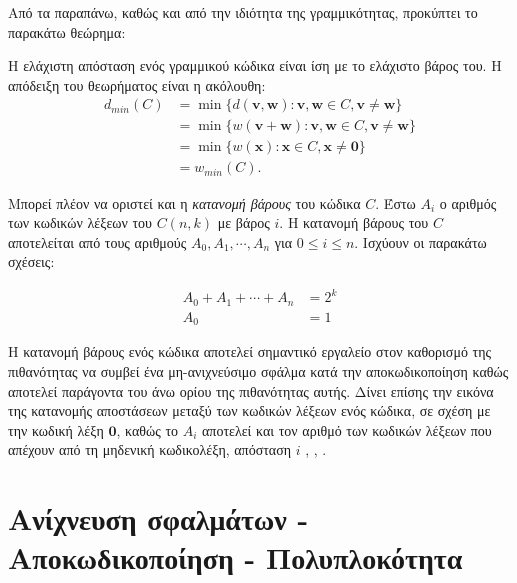 Από τα παραπάνω, καθώς και από την ιδιότητα της γραμμικότητας, προκύπτει το παρακάτω θεώρημα:

\begin{theorem}
Η ελάχιστη απόσταση ενός γραμμικού κώδικα είναι ίση με το ελάχιστο βάρος του. Η απόδειξη του θεωρήματος είναι η ακόλουθη:
\begin{equation}
\begin{split}
d_{min}(C) & = \min \lbrace d \left( \mathbf{v},\mathbf{w} \right) : \mathbf{v},\mathbf{w} \in C, \mathbf{v}\neq\mathbf{w} \rbrace \\
& = \min \lbrace w \left( \mathbf{v}+\mathbf{w} \right) : \mathbf{v},\mathbf{w} \in C, \mathbf{v}\neq\mathbf{w} \rbrace \\
& = \min \lbrace w \left( \mathbf{x} \right) : \mathbf{x} \in C, \mathbf{x}\neq\mathbf{0} \rbrace \\
& = w_{min}(C).
\end{split}
\end{equation}
\label{theorem:min distance}
\end{theorem}

\vspace{3mm}
Μπορεί πλέον να οριστεί και η \textit{κατανομή βάρους} του κώδικα $C$. Έστω $A_i$ ο αριθμός των κωδικών λέξεων του $C(n,k)$ με βάρος  $i$. Η κατανομή βάρους του $C$ αποτελείται από τους αριθμούς $A_0,A_1,\cdots,A_n$ για $0\leq i \leq n$. Ισχύουν οι παρακάτω σχέσεις:

\begin{equation}
\begin{aligned}
A_0+A_1+\cdots+A_n& = 2^k \\ 
Α_0 & =  1
\end{aligned}
\end{equation}

Η κατανομή βάρους ενός κώδικα αποτελεί σημαντικό εργαλείο στον καθορισμό της πιθανότητας να συμβεί ένα μη-ανιχνεύσιμο σφάλμα κατά την αποκωδικοποίηση καθώς αποτελεί παράγοντα του άνω ορίου της πιθανότητας αυτής. Δίνει επίσης την εικόνα της κατανομής αποστάσεων μεταξύ των κωδικών λέξεων ενός κώδικα, σε σχέση με την κωδική λέξη $\mathbf{0}$, καθώς το $A_i$ αποτελεί και τον αριθμό των κωδικών λέξεων που απέχουν από τη μηδενική κωδικολέξη, απόσταση $i$ \cite{ryan2009channel}, \cite{macwilliams1977theory}, \cite{peterson1972error}.

\section{Ανίχνευση σφαλμάτων - Αποκωδικοποίηση - Πολυπλοκότητα}

